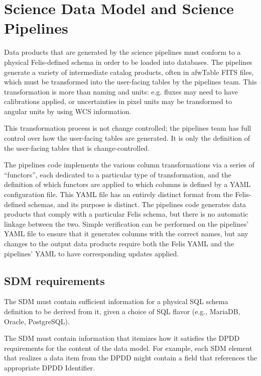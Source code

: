 
\section {Science Data Model and Science Pipelines}\label{sec:sdm}


Data products that are generated by the science pipelines must conform to a physical Felis-defined
schema in order to be loaded into databases. The pipelines generate a variety of intermediate
catalog products, often in afwTable FITS files, which must be transformed into the user-facing
tables by the pipelines team. This transformation is more than naming and units: e.g. fluxes may
need to have calibrations applied, or uncertainties in pixel units may be transformed to angular
units by using WCS information.

This transformation process is not change controlled; the pipelines team has full control over how
the user-facing tables are generated. It is only the definition of the user-facing tables that is
change-controlled.

The pipelines code implements the various column transformations via a series of ``functors'', each
dedicated to a particular type of transformation, and the definition of which functors are applied
to which columns is defined by a YAML configuration file. This YAML file has an entirely distinct
format from the Felis-defined schemas, and its purpose is distinct. The pipelines code generates
data products that comply with a particular Felis schema, but there is no automatic linkage between
the two. Simple verification can be performed on the pipelines' YAML file to ensure that it
generates columns with the correct names, but any changes to the output data products require both
the Felis YAML and the pipelines' YAML to have corresponding updates applied.




\subsection{SDM requirements}
The SDM must contain sufficient information for a physical SQL schema definition to be derived from it, given a choice of SQL flavor (e.g., MariaDB, Oracle, PostgreSQL).

The SDM must contain information that itemizes how it satisfies the DPDD requirements for the content of the data model.  For example, each SDM element that realizes a data item from the DPDD might contain a field that references the appropriate DPDD Identifier.

